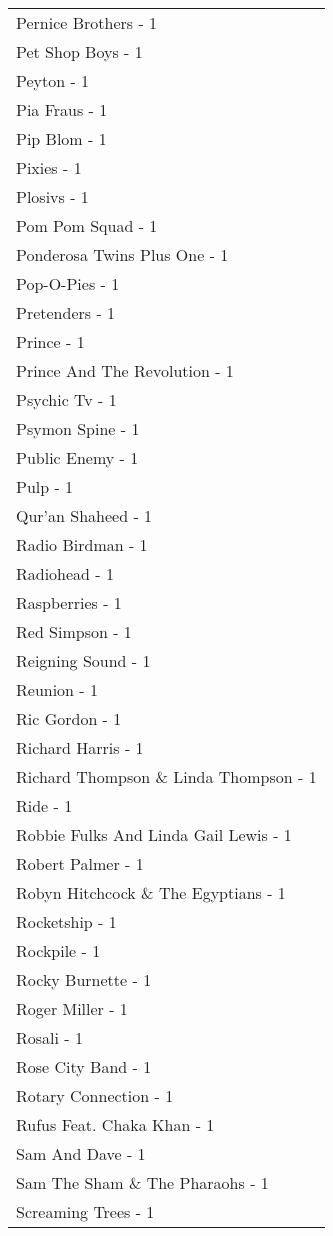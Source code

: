 \documentclass[
]{article}
\begin{document}
\begin{longtable}{l}
Pernice Brothers - 1 \\ 
Pet Shop Boys - 1 \\ 
Peyton - 1 \\ 
Pia Fraus - 1 \\ 
Pip Blom - 1 \\ 
Pixies - 1 \\ 
Plosivs - 1 \\ 
Pom Pom Squad - 1 \\ 
Ponderosa Twins Plus One - 1 \\ 
Pop-O-Pies - 1 \\ 
Pretenders - 1 \\ 
Prince - 1 \\ 
Prince And The Revolution - 1 \\ 
Psychic Tv - 1 \\ 
Psymon Spine - 1 \\ 
Public Enemy - 1 \\ 
Pulp - 1 \\ 
Qur'an Shaheed - 1 \\ 
Radio Birdman - 1 \\ 
Radiohead - 1 \\ 
Raspberries - 1 \\ 
Red Simpson - 1 \\ 
Reigning Sound - 1 \\ 
Reunion - 1 \\ 
Ric Gordon - 1 \\ 
Richard Harris - 1 \\ 
Richard Thompson \& Linda Thompson - 1 \\ 
Ride - 1 \\ 
Robbie Fulks And Linda Gail Lewis - 1 \\ 
Robert Palmer - 1 \\ 
Robyn Hitchcock \& The Egyptians - 1 \\ 
Rocketship - 1 \\ 
Rockpile - 1 \\ 
Rocky Burnette - 1 \\ 
Roger Miller - 1 \\ 
Rosali - 1 \\ 
Rose City Band - 1 \\ 
Rotary Connection - 1 \\ 
Rufus Feat. Chaka Khan - 1 \\ 
Sam And Dave - 1 \\ 
Sam The Sham \& The Pharaohs - 1 \\ 
Screaming Trees - 1 \\ 

\end{longtable}
\end{document}
